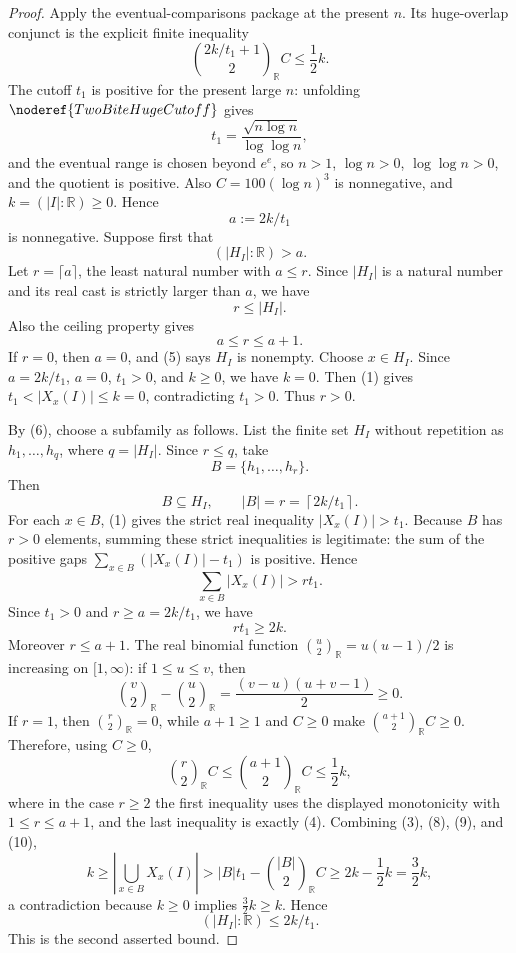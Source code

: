 \begin{proof}
Apply the eventual-comparisons package at the present \(n\).  Its
huge-overlap conjunct is the explicit finite inequality
\[
\binom{2k/t_1+1}{2}_{\mathbb R}C\le\frac12k. \tag{4}
\]
The cutoff \(t_1\) is positive for the present large \(n\): unfolding
\(\noderef{TwoBiteHugeCutoff}\) gives
\[
t_1=\frac{\sqrt{n\log n}}{\log\log n},
\]
and the eventual range is chosen beyond \(e^e\), so \(n>1\),
\(\log n>0\), \(\log\log n>0\), and the quotient is positive.  Also
\(C=100(\log n)^3\) is nonnegative, and \(k=(|I|:\mathbb R)\ge0\).  Hence
\[
a:=2k/t_1
\]
is nonnegative.  Suppose first that
\[
(|H_I|:\mathbb R)>a. \tag{5}
\]
Let \(r=\lceil a\rceil\), the least natural number with \(a\le r\).  Since
\(|H_I|\) is a natural number and its real cast is strictly larger than \(a\),
we have
\[
r\le |H_I|. \tag{6}
\]
Also the ceiling property gives
\[
a\le r\le a+1. \tag{7}
\]
If \(r=0\), then \(a=0\), and (5) says \(H_I\) is nonempty.  Choose
\(x\in H_I\).  Since \(a=2k/t_1\), \(a=0\), \(t_1>0\), and \(k\ge0\), we have
\(k=0\).  Then (1) gives \(t_1<|X_x(I)|\le k=0\), contradicting \(t_1>0\).
Thus \(r>0\).

By (6), choose a subfamily as follows.  List the finite set \(H_I\) without
repetition as \(h_1,\ldots,h_q\), where \(q=|H_I|\).  Since \(r\le q\), take
\[
B=\{h_1,\ldots,h_r\}.
\]
Then
\[
B\subseteq H_I,\qquad |B|=r=\left\lceil 2k/t_1\right\rceil.
\]
For each \(x\in B\), (1) gives the strict real inequality
\(|X_x(I)|>t_1\).  Because \(B\) has \(r>0\) elements, summing these strict
inequalities is legitimate: the sum of the positive gaps
\(\sum_{x\in B}(|X_x(I)|-t_1)\) is positive.  Hence
\[
\sum_{x\in B}|X_x(I)|>rt_1. \tag{8}
\]
Since \(t_1>0\) and \(r\ge a=2k/t_1\), we have
\[
rt_1\ge 2k. \tag{9}
\]
Moreover \(r\le a+1\).  The real binomial function
\(\binom u2_{\mathbb R}=u(u-1)/2\) is increasing on \([1,\infty)\): if
\(1\le u\le v\), then
\[
\binom v2_{\mathbb R}-\binom u2_{\mathbb R}
  =\frac{(v-u)(u+v-1)}2\ge0.
\]
If \(r=1\), then \(\binom r2_{\mathbb R}=0\), while
\(a+1\ge1\) and \(C\ge0\) make
\(\binom{a+1}{2}_{\mathbb R}C\ge0\).  Therefore, using \(C\ge0\),
\[
\binom r2_{\mathbb R}C
\le
\binom{a+1}{2}_{\mathbb R}C
\le \frac12 k, \tag{10}
\]
where in the case \(r\ge2\) the first inequality uses the displayed
monotonicity with \(1\le r\le a+1\), and the last inequality is exactly (4).
Combining (3), (8), (9), and (10),
\[
k\ge\left|\bigcup_{x\in B}X_x(I)\right|
> |B|t_1-\binom{|B|}{2}_{\mathbb R}C
\ge 2k-\frac12k=\frac32k,
\]
a contradiction because \(k\ge0\) implies \(\frac32k\ge k\).  Hence
\[
(|H_I|:\mathbb R)\le 2k/t_1. \tag{11}
\]
This is the second asserted bound.


\end{proof}
